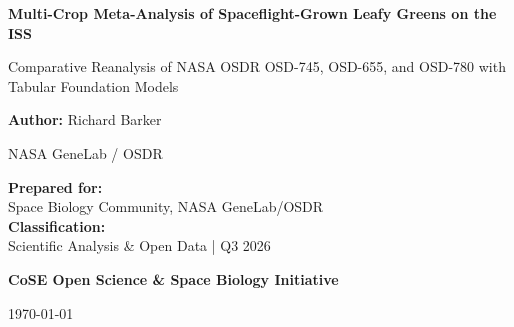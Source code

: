 \documentclass[11pt,twoside,openright]{report}
\begin{document}
\begin{titlepage}
    \centering
    \vspace*{2cm}
    
    {\Huge\sffamily\bfseries\color{cosenavy} Multi-Crop Meta-Analysis of Spaceflight-Grown Leafy Greens on the ISS \par}
    \vspace{1cm}
    {\Large\sffamily\color{coseblue} Comparative Reanalysis of NASA OSDR OSD-745, OSD-655, and OSD-780 with Tabular Foundation Models \par}
    
    \vspace{2.5cm}
    
    {\Large\textbf{Author:} Richard Barker\par}
    \vspace{0.5cm}
    {\large NASA GeneLab / OSDR \par}
    
    \vspace{3cm}
    
    \begin{tcolorbox}[colback=cosegray,colframe=cosenavy,arc=4mm,boxrule=1.5pt,width=0.8\textwidth,center]
        \centering
        \textbf{Prepared for:}\\
        Space Biology Community, NASA GeneLab/OSDR\\
        \vspace{0.5cm}
        \textbf{Classification:}\\
        Scientific Analysis \& Open Data | Q3 2026
    \end{tcolorbox}
    
    \vfill
    
    {\large \textbf{CoSE Open Science \& Space Biology Initiative} \par}
    {\large \today \par}
\end{titlepage}

\tableofcontents
\clearpage
\listoffigures
\clearpage
\listoftables
\clearpage










\end{document}
